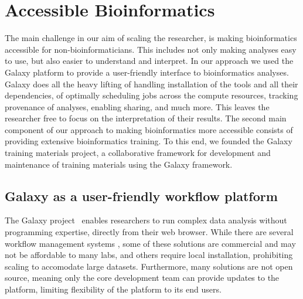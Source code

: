 

\section{Accessible Bioinformatics}

The main challenge in our aim of scaling the researcher, is making bioinformatics accessible for non-bioinformaticians. This includes not only making analyses easy to use, but also easier to understand and interpret.
In our approach we used the Galaxy platform to provide a user-friendly interface to bioinformatics analyses. Galaxy does all the heavy lifting of handling installation of the tools and all their dependencies, of optimally scheduling jobs across the compute resources, tracking provenance of analyses, enabling sharing, and much more. This leaves the researcher free to focus on the interpretation of their results.
The second main component of our approach to making bioinformatics more accessible consists of providing extensive bioinformatics training. To this end, we founded the Galaxy training materials project, a collaborative framework for development and maintenance of training materials using the Galaxy framework.


\subsection{Galaxy as a user-friendly workflow platform}

The Galaxy project~\cite{giardine2005galaxy,blankenberg2010galaxy,afgan2016galaxy} enables researchers to run complex data analysis without programming expertise, directly from their web browser. While there are several workflow management systems \cite{clcbio,oinn2004taverna,onlinehpc,anduril,molgenis}, some of these solutions are commercial and may not be affordable to many labs, and others require local installation, prohibiting scaling to accomodate large datasets. Furthermore, many solutions are not open source, meaning only the core development team can provide updates to the platform, limiting flexibility of the platform to its end users.

